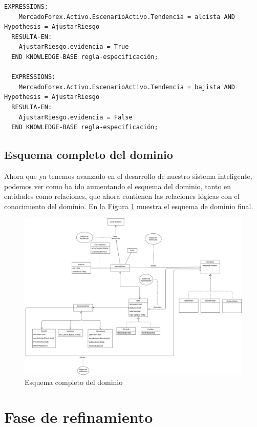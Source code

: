 \begin{lstlisting}[style=Python-color, caption={regla-verificación}]
  EXPRESSIONS:
    MercadoForex.Activo.EscenarioActivo.Tendencia = alcista AND Hypothesis = AjustarRiesgo
  RESULTA-EN:
    AjustarRiesgo.evidencia = True
  END KNOWLEDGE-BASE regla-especificación;

  EXPRESSIONS:
    MercadoForex.Activo.EscenarioActivo.Tendencia = bajista AND Hypothesis = AjustarRiesgo
  RESULTA-EN:
    AjustarRiesgo.evidencia = False
  END KNOWLEDGE-BASE regla-especificación;

\end{lstlisting}
\newpage

\subsection{Esquema completo del dominio}
Ahora que ya tenemos avanzado en el desarrollo de nuestro sistema inteligente, podemos ver como ha ido aumentando el esquema del dominio, tanto en entidades como relaciones, que ahora contienen las relaciones lógicas con el conocimiento del dominio. En la Figura \ref{fig:DominioCompleto} muestra el esquema de dominio final.

\begin{figure}[H]
  \centering
  \includegraphics[scale=0.25]{imagenes/DiagramaCompleto.png}
  \caption{\label{fig:DominioCompleto}Esquema completo del dominio}
\end{figure}
\newpage

\section{Fase de refinamiento}
